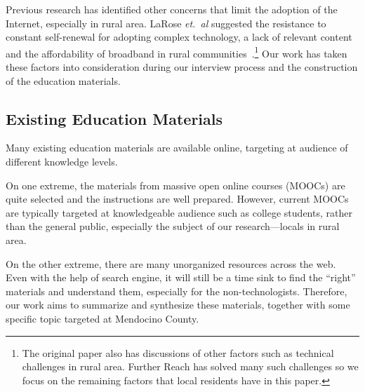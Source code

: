 Previous research has identified other concerns that limit the adoption of the
Internet, especially in rural area. LaRose {\em et.~al} suggested the resistance
to constant self-renewal for adopting complex technology, a lack of relevant
content and the affordability of broadband in rural
communities~\cite{larose2007closing}.\footnote{The original paper also has
  discussions of other factors such as technical challenges in rural
  area. Further Reach has solved many such challenges so we focus on the
  remaining factors that local residents have in this paper.} Our work has taken
these factors into consideration during our interview process and the
construction of the education materials.

\subsection{Existing Education Materials}
\label{sec:exist-educ-mater}

Many existing education materials are available online, targeting at audience of
different knowledge levels.

On one extreme, the materials from massive open online courses (MOOCs)
\cite{pappano2012year} are quite selected and the instructions are well
prepared. However, current MOOCs are typically targeted at knowledgeable
audience such as college students, rather than the general public, especially
the subject of our research---locals in rural area.

On the other extreme, there are many unorganized resources across the web. Even
with the help of search engine, it will still be a time sink to find the
``right'' materials and understand them, especially for the
non-technologists. Therefore, our work aims to summarize and synthesize these
materials, together with some specific topic targeted at Mendocino County.

